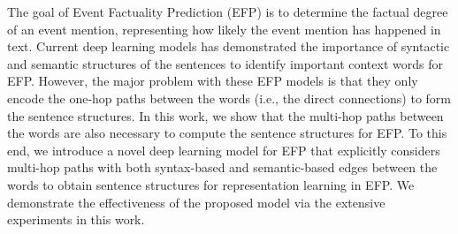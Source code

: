 The goal of Event Factuality Prediction (EFP) is to determine the factual degree of an event mention, representing how likely the event mention has happened in text. Current deep learning models has demonstrated the importance of syntactic and semantic structures of the sentences to identify important context words for EFP. However, the major problem with these EFP models is that they only encode the one-hop paths between the words (i.e., the direct connections) to form the sentence structures. In this work, we show that the multi-hop paths between the words are also necessary to compute the sentence structures for EFP. To this end, we introduce a novel deep learning model for EFP that explicitly considers multi-hop paths with both syntax-based and semantic-based edges between the words to obtain sentence structures for representation learning in EFP. We demonstrate the effectiveness of the proposed model via the extensive experiments in this work.
